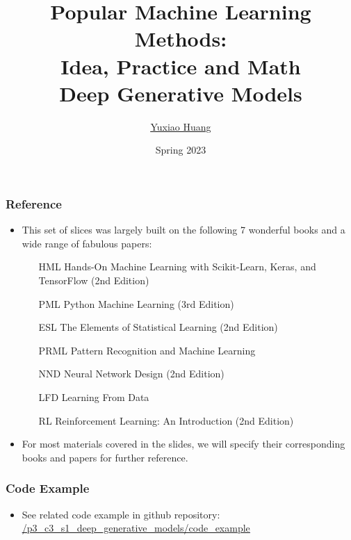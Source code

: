\documentclass{beamer}
\title[Deep Generative Models]{\textbf{Popular Machine Learning Methods:\\ Idea, Practice and Math}\\
\medskip
Deep Generative Models} %
\author{\underline{\href{https://sites.google.com/view/yuxiaohuang}{Yuxiao Huang}}} %
\institute[GWU] %
{
Data Science, Columbian College of Arts \& Sciences\\
George Washington University \\ %
}
\date{Spring 2023} %
\begin{document}
\begin{frame}
\setlength{\leftmargini}{0.3cm}
\setlength{\leftmarginii}{0.6cm}
\setlength{\leftmarginiii}{0.9cm}
\titlepage %
\end{frame}

\begin{frame}
\setlength{\leftmargini}{0.3cm}
\setlength{\leftmarginii}{0.6cm}
\setlength{\leftmarginiii}{0.9cm}
\frametitle{Reference} %
\begin{itemize}
\footnotesize
\item This set of slices was largely built on the following 7 wonderful books and a wide range of fabulous papers:
	\begin{enumerate}
	\footnotesize
	\item [HML] Hands-On Machine Learning with Scikit-Learn, Keras, and TensorFlow (2nd Edition)
	\item [PML] Python Machine Learning (3rd Edition)
	\item [ESL] The Elements of Statistical Learning (2nd Edition)
	\item [PRML] Pattern Recognition and Machine Learning
	\item [NND] Neural Network Design (2nd Edition)
	\item [LFD] Learning From Data
    \item [RL] Reinforcement Learning: An Introduction (2nd Edition)
	\end{enumerate}
\item For most materials covered in the slides, we will specify their corresponding books and papers for further reference.
\end{itemize}
\end{frame}

\begin{frame}
\setlength{\leftmargini}{0.3cm}
\setlength{\leftmarginii}{0.6cm}
\setlength{\leftmarginiii}{0.9cm}
\frametitle{Code Example}
\begin{itemize}
\item See related code example in github repository: \textcolor{blue}{\underline{\href{https://github.com/yuxiaohuang/teaching/blob/master/gwu/machine_learning_I/spring_2023/code/p3_deep_learning/p3_c3_unsupervised_learning/p3_c3_s1_deep_generative_models/code_example/}{/p3\_c3\_s1\_deep\_generative\_models/code\_example}}}
\end{itemize}
\end{frame}
\end{document}
